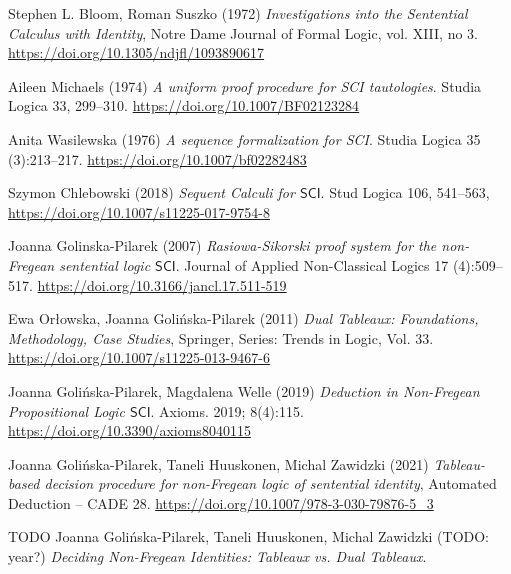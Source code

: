 \documentclass{article}
\theoremstyle{definition}
\newtheorem{definition}{Definition}[section]
\theoremstyle{definition}
\theoremstyle{definition}
\theoremstyle{definition}
\theoremstyle{definition}
\newcommand{\SCI}{$\mathsf{SCI}$\xspace}
\begin{document}
\begin{thebibliography}{9}
    Stephen L. Bloom, Roman Suszko (1972) \emph{Investigations into the Sentential Calculus with Identity}, Notre Dame Journal of Formal Logic, vol. XIII, no 3. \url{https://doi.org/10.1305/ndjfl/1093890617}

    Aileen Michaels (1974) \emph{A uniform proof procedure for SCI tautologies}. Studia Logica 33, 299--310. \url{https://doi.org/10.1007/BF02123284}

    Anita Wasilewska (1976) \emph{A sequence formalization for SCI}. Studia Logica 35 (3):213--217. \url{https://doi.org/10.1007/bf02282483}

    Szymon Chlebowski (2018) \emph{Sequent Calculi for \SCI}. Stud Logica 106, 541--563, \url{https://doi.org/10.1007/s11225-017-9754-8}

    Joanna Golinska-Pilarek (2007) \emph{Rasiowa-Sikorski proof system for the non-Fregean sentential logic \SCI}. Journal of Applied Non-Classical Logics 17 (4):509--517. \url{https://doi.org/10.3166/jancl.17.511-519}

    Ewa Orłowska, Joanna Golińska-Pilarek (2011) \emph{Dual Tableaux: Foundations, Methodology, Case Studies}, Springer, Series: Trends in Logic, Vol. 33. \url{https://doi.org/10.1007/s11225-013-9467-6}

    Joanna Golińska-Pilarek, Magdalena Welle (2019) \emph{Deduction in Non-Fregean Propositional Logic \SCI}. Axioms. 2019; 8(4):115. \url{https://doi.org/10.3390/axioms8040115}

    Joanna Golińska-Pilarek, Taneli Huuskonen, Michal Zawidzki (2021) \emph{Tableau-based decision procedure for non-Fregean logic of sentential identity}, Automated Deduction -- CADE 28. \url{https://doi.org/10.1007/978-3-030-79876-5_3}

    {
        \color{red}
        TODO Joanna Golińska-Pilarek, Taneli Huuskonen, Michal Zawidzki (TODO: year?) \emph{Deciding Non-Fregean Identities: Tableaux vs. Dual Tableaux}.
    }

\end{thebibliography}


\end{document}
